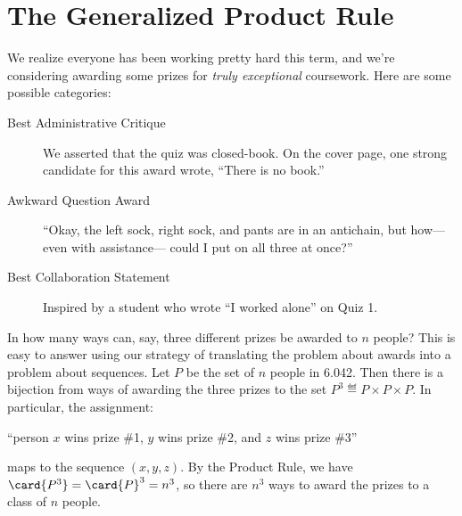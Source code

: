 \newcommand{\spa}{\spadesuit}
\newcommand{\hea}{\heartsuit}
\newcommand{\dia}{\diamondsuit}
\newcommand{\clu}{\clubsuit}

\begin{problems}
\classproblems
{}

\homeworkproblems
{}
\end{problems}

\section{The Generalized Product Rule}\label{generalized_product_sec}

We realize everyone has been working pretty hard this term, and we're
considering awarding some prizes for \emph{truly exceptional}
coursework.  Here are some possible categories:

\begin{description}

\item[Best Administrative Critique] We asserted that the quiz was
closed-book.  On the cover page, one strong candidate for this award
wrote, ``There is no book.''

\item[Awkward Question Award] ``Okay, the left sock, right sock, and
pants are in an antichain, but how--- even with assistance--- could I
put on all three at once?''

\item[Best Collaboration Statement] Inspired by a student who wrote
``I worked alone'' on Quiz 1.

\end{description}

In how many ways can, say, three different prizes be awarded to $n$
people?  This is easy to answer using our strategy of translating the
problem about awards into a problem about sequences.  Let $P$ be the set
of $n$ people in 6.042.  Then there is a bijection from ways of awarding
the three prizes to the set $P^3 \eqdef P \times P \times P$.  In
particular, the assignment:
%
\begin{center}
``person $x$ wins prize \#1, $y$ wins prize \#2, and $z$ wins prize \#3''
\end{center}
%
maps to the sequence $(x, y, z)$.  By the Product Rule, we have
$\card{P^3}= \card{P}^3 = n^3$, so there are $n^3$ ways to award the
prizes to a class of $n$ people.

